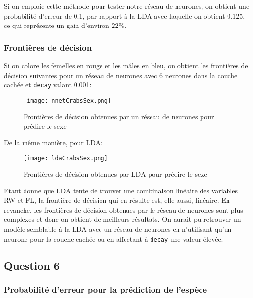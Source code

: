 \documentclass{article}
\begin{document}
\begin{multicols}{2}
Si on emploie cette méthode pour tester notre réseau de neurones, on obtient
une probabilité d'erreur de 0.1, par rapport à la LDA avec laquelle on obtient
0.125, ce qui représente un gain d'environ 22\%.

\subsubsection{Frontières de décision}\label{subsubsec:ex252}

Si on colore les femelles en rouge et les mâles en bleu, on obtient les
frontières de décision suivantes pour un réseau de neurones avec 6 neurones dans
la couche cachée et \texttt{decay} valant 0.001:

\begin{figure}[H]
    \begin{center}
        \texttt{[image: nnetCrabsSex.png]}
        \centering
        \captionsetup{justification=centering}
        \caption{\label{fig:nnetSex}Frontières de décision obtenues par un réseau de neurones pour prédire le sexe}
    \end{center}
\end{figure}

De la même manière, pour LDA:

\begin{figure}[H]
    \begin{center}
        \texttt{[image: ldaCrabsSex.png]}
        \centering
        \captionsetup{justification=centering}
        \caption{\label{fig:ldaSex}Frontières de décision obtenues par LDA pour prédire le sexe}
    \end{center}
\end{figure}

Etant donne que LDA tente de trouver une combinaison linéaire des variables RW
et FL, la frontière de décision qui en résulte est, elle aussi, linéaire. En
revanche, les frontières de décision obtenues par le réseau de neurones sont
plus complexes et donc on obtient de meilleurs résultats. On aurait pu retrouver
un modèle semblable à la LDA avec un réseau de neurones en n'utilisant qu'un
neurone pour la couche cachée ou en affectant à \texttt{decay} une valeur
élevée.

\subsection{Question 6}\label{subsec:ex26}

\subsubsection{Probabilité d'erreur pour la prédiction de l'espèce}\label{subsubsec:ex261}


\end{multicols}
\end{document}
